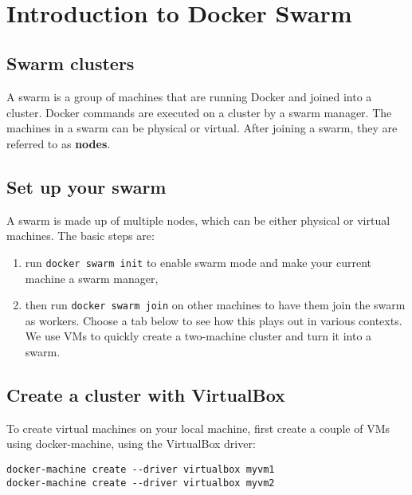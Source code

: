 \MDNAME\

\section{Introduction to Docker Swarm}

\subsection{Swarm clusters}

A swarm is a group of machines that are running Docker and joined into a
cluster. Docker commands are executed on a cluster by a swarm manager.
The machines in a swarm can be physical or virtual. After joining a
swarm, they are referred to as \textbf{nodes}.

\subsection{Set up your swarm}

A swarm is made up of multiple nodes, which can be either physical or
virtual machines. The basic steps are:

\begin{enumerate}
\def\labelenumi{\arabic{enumi}.}
\item
  run \texttt{docker\ swarm\ init} to enable swarm mode and make your
  current machine a swarm manager,
\item
  then run \texttt{docker\ swarm\ join} on other machines to have them
  join the swarm as workers. Choose a tab below to see how this plays
  out in various contexts. We use VMs to quickly create a two-machine
  cluster and turn it into a swarm.
\end{enumerate}

\subsection{Create a cluster with VirtualBox}

To create virtual machines on your local machine, first create a couple
of VMs using docker-machine, using the VirtualBox driver:

\begin{lstlisting}
docker-machine create --driver virtualbox myvm1
docker-machine create --driver virtualbox myvm2
\end{lstlisting}

